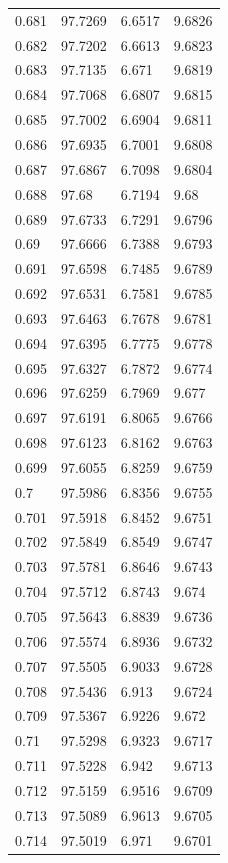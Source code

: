 \begin{tabular}{llll}
0.681 & 97.7269 & 6.6517 & 9.6826 \\
0.682 & 97.7202 & 6.6613 & 9.6823 \\
0.683 & 97.7135 & 6.671 & 9.6819 \\
0.684 & 97.7068 & 6.6807 & 9.6815 \\
0.685 & 97.7002 & 6.6904 & 9.6811 \\
0.686 & 97.6935 & 6.7001 & 9.6808 \\
0.687 & 97.6867 & 6.7098 & 9.6804 \\
0.688 & 97.68 & 6.7194 & 9.68 \\
0.689 & 97.6733 & 6.7291 & 9.6796 \\
0.69 & 97.6666 & 6.7388 & 9.6793 \\
0.691 & 97.6598 & 6.7485 & 9.6789 \\
0.692 & 97.6531 & 6.7581 & 9.6785 \\
0.693 & 97.6463 & 6.7678 & 9.6781 \\
0.694 & 97.6395 & 6.7775 & 9.6778 \\
0.695 & 97.6327 & 6.7872 & 9.6774 \\
0.696 & 97.6259 & 6.7969 & 9.677 \\
0.697 & 97.6191 & 6.8065 & 9.6766 \\
0.698 & 97.6123 & 6.8162 & 9.6763 \\
0.699 & 97.6055 & 6.8259 & 9.6759 \\
0.7 & 97.5986 & 6.8356 & 9.6755 \\
0.701 & 97.5918 & 6.8452 & 9.6751 \\
0.702 & 97.5849 & 6.8549 & 9.6747 \\
0.703 & 97.5781 & 6.8646 & 9.6743 \\
0.704 & 97.5712 & 6.8743 & 9.674 \\
0.705 & 97.5643 & 6.8839 & 9.6736 \\
0.706 & 97.5574 & 6.8936 & 9.6732 \\
0.707 & 97.5505 & 6.9033 & 9.6728 \\
0.708 & 97.5436 & 6.913 & 9.6724 \\
0.709 & 97.5367 & 6.9226 & 9.672 \\
0.71 & 97.5298 & 6.9323 & 9.6717 \\
0.711 & 97.5228 & 6.942 & 9.6713 \\
0.712 & 97.5159 & 6.9516 & 9.6709 \\
0.713 & 97.5089 & 6.9613 & 9.6705 \\
0.714 & 97.5019 & 6.971 & 9.6701 \\

\end{tabular}
